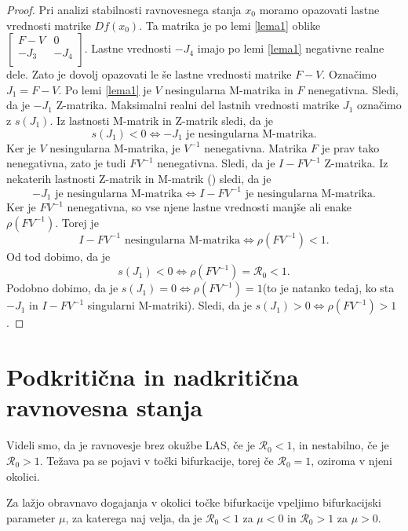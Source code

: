 \documentclass[a4paper,12pt]{article}
\newcommand{\R}{\mathcal R}
\begin{document}
\begin{proof}
    Pri analizi stabilnosti ravnovesnega stanja \(x_0\) moramo opazovati lastne vrednosti matrike \(Df(x_0)\).
    Ta matrika je po lemi \ref{lema1} oblike 
    \(
    \begin{bmatrix}
        F-V & 0 \\
        -J_3 & -J_4 \\
    \end{bmatrix}
    \).
    Lastne vrednosti \(-J_4\) imajo po lemi \ref{lema1} negativne realne dele. Zato je dovolj opazovati le še lastne 
    vrednosti matrike \(F-V\).
    Označimo \(J_1=F-V\). Po lemi \ref{lema1} je \(V\) nesingularna M-matrika in \(F\) nenegativna. 
    Sledi, da je \(-J_1\) Z-matrika. 
    Maksimalni realni del lastnih vrednosti matrike \(J_1\) označimo z \(s(J_1)\). Iz lastnosti 
    M-matrik in Z-matrik sledi, da je 
    \[s(J_1)<0 \Leftrightarrow -J_1\textrm{ je nesingularna M-matrika}.\]
    Ker je \(V\) nesingularna M-matrika, je \(V^{-1}\) nenegativna. Matrika \(F\) je prav tako 
    nenegativna, zato je tudi \(FV^{-1}\) nenegativna. Sledi, da je \(I-FV^{-1}\) Z-matrika. 
    Iz nekaterih lastnosti Z-matrik in M-matrik (\cite{vir1}) sledi, da je 
    \[-J_1\textrm{ je nesingularna M-matrika}\Leftrightarrow I-FV^{-1} \textrm{ je nesingularna M-matrika}.\]
    Ker je \(FV^{-1}\) nenegativna, so vse njene lastne vrednosti manjše ali enake \(\rho(FV^{-1})\). Torej je 
    \[I-FV^{-1}\textrm{ nesingularna M-matrika}\Leftrightarrow \rho(FV^{-1})<1. \]
    Od tod dobimo, da je 
    \[s(J_1)<0 \Leftrightarrow \rho(FV^{-1})=\R_0<1.\]
    Podobno dobimo, da je \(s(J_1)=0\Leftrightarrow \rho(FV^{-1})=1\)(to je natanko tedaj, ko sta \(-J_1\) in \(I-FV^{-1}\) singularni M-matriki). 
    Sledi, da je \(s(J_1)>0 \Leftrightarrow \rho(FV^{-1})>1\).

\end{proof}

\section{Podkritična in nadkritična ravnovesna stanja}

Videli smo, da je ravnovesje brez okužbe LAS, če je \(\R_0<1\), in nestabilno, če 
je \(\R_0>1\). Težava pa se pojavi v točki bifurkacije, torej če \(\R_0=1\), oziroma
v njeni okolici.

Za lažjo obravnavo dogajanja v okolici točke bifurkacije vpeljimo bifurkacijski parameter
\(\mu\), za katerega naj velja, da je \(\R_0<1\) za \(\mu<0\) in \(\R_0>1\) za \(\mu>0\).
\end{document}
